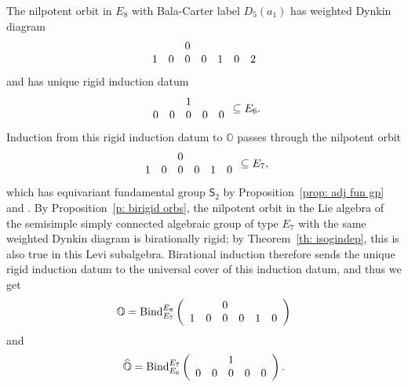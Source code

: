 \documentclass[11pt]{amsart}
\renewcommand{\O}{{\mathbb O}}
\newcommand{\Sym}{{\mathsf{S}}}
\newcommand{\BInd}{{{\mbox{\rm Bind}}}}
\newcommand{\hatO}{\widehat{\O}}
\numberwithin{equation}{section}
\begin{document}
	The nilpotent orbit in $E_8$ with Bala-Carter label $D_5(a_1)$ has weighted Dynkin diagram
	$$\begin{array}{c c c c c c c}
		& & 0 & & & & \\
		1 & 0 & 0 & 0 & 1 & 0 & 2 \\
	\end{array}$$ and has unique rigid induction datum $$\begin{array}{c c c c c}
		&  & 1 & & \\
		0 & 0 & 0 & 0 & 0 \\
	\end{array}\subseteq E_6.$$ Induction from this rigid induction datum to $\O$ passes through the nilpotent orbit $$\begin{array}{c c c c c c c}
		& & 0 & & & \\
		1 & 0 & 0 & 0 & 1 & 0 \\
	\end{array}\subseteq E_7,$$ which has equivariant fundamental group $\Sym_2$ by Proposition~\ref{prop: adj fun gp} and \cite[\S 8.4]{CM}. By Proposition~\ref{p: birigid orbs}, the nilpotent orbit in the Lie algebra of the semisimple simply connected algebraic group of type $E_7$ with the same weighted Dynkin diagram is birationally rigid; by Theorem~\ref{th: isogindep}, this is also true in this Levi subalgebra. Birational induction therefore sends the unique rigid induction datum to the universal cover of this induction datum, and thus we get $$\O=\BInd_{E_7}^{E_8}\left(\begin{array}{c c c c c c c}
		& & 0 & & & \\
		1 & 0 & 0 & 0 & 1 & 0 \\
	\end{array}\right)$$ and $$\hatO=\BInd_{E_6}^{E_7}\left(\begin{array}{c c c c c}
		&  & 1 & & \\
		0 & 0 & 0 & 0 & 0 \\
	\end{array}\right).$$
	
	
	
\end{document}
